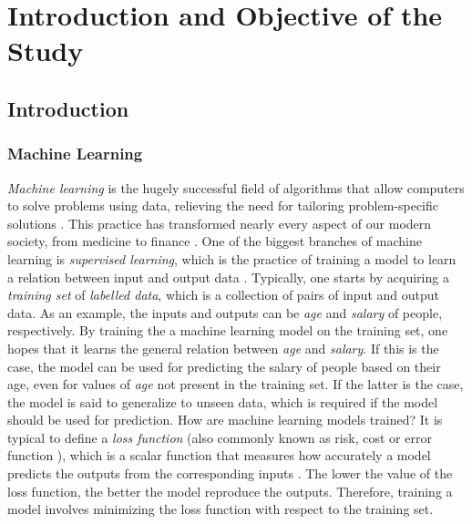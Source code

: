 \chapter{Introduction and Objective of the Study}

\section{Introduction}\label{sec:Introduction}

\subsection{Machine Learning}\label{sec:Machine Learning Intro}


\emph{Machine learning} is the hugely successful field of algorithms that allow computers to solve problems using data, relieving the need for tailoring problem-specific solutions \cite{SupervisedwquantumComputers}. This practice has transformed nearly every aspect of our modern society, from medicine \cite{medicine} to finance \cite{finance}. One of the biggest branches of machine learning is \emph{supervised learning}, which is the practice of training a model to learn a relation between input and output data \cite{hastie01statisticallearning}. Typically, one starts by acquiring a \emph{training set} of \emph{labelled data}, which is a collection of pairs of input and output data. As an example, the inputs and outputs can be \emph{age} and \emph{salary} of people, respectively. By training the a machine learning model on the training set, one hopes that it learns the general relation between \emph{age} and \emph{salary}. If this is the case, the model can be used for predicting the salary of people based on their age, even for values of \emph{age} not present in the training set. If the latter is the case, the model is said to generalize to unseen data, which is required if the model should be used for prediction. How are machine learning models trained? It is typical to define a \emph{loss function} (also commonly known as risk, cost or error function \citet{}), which is a scalar function that measures how accurately a model predicts the outputs from the corresponding inputs \cite{hastie01statisticallearning}. The lower the value of the loss function, the better the model reproduce the outputs. Therefore, training a model involves minimizing the loss function with respect to the training set.

